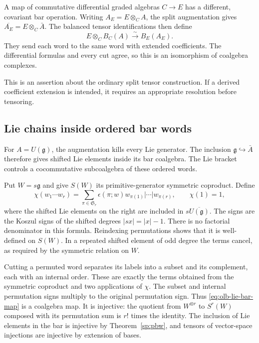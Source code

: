 A map of commutative differential graded algebras $C\to E$
has a different, covariant bar operation.
Writing $A_E=E\otimes_C A$, the split augmentation gives
$\overline{A_E}=E\otimes_C\bar A$.
The balanced tensor identifications then define
\[
 E\otimes_C B_C(A)\xrightarrow{\sim}B_E(A_E).
\]
They send each word to the same word with extended coefficients.
The differential formulas and every cut agree, so this is an
isomorphism of coalgebra complexes.

This is an assertion about the ordinary split tensor construction.
If a derived coefficient extension is intended, it requires an
appropriate resolution before tensoring.

\subsection{Lie chains inside ordered bar words}
\label{sec:olb-lie-chains}

For $A=U(\mathfrak g)$, the augmentation kills every Lie
generator.  The inclusion $\mathfrak g\hookrightarrow\bar A$
therefore gives shifted Lie elements inside its bar coalgebra.
The Lie bracket controls a cocommutative subcoalgebra of these
ordered words.

Put $W=s\mathfrak g$ and give $S(W)$ its primitive-generator
symmetric coproduct.  Define
\begin{equation}
 \chi(w_1\cdots w_r)=
 \sum_{\pi\in\mathfrak S_r}\epsilon(\pi;w)
 w_{\pi(1)}|\cdots|w_{\pi(r)},\qquad \chi(1)=1,
 \label{eq:olb-lie-bar-map}
\end{equation}
where the shifted Lie elements on the right are included in
$s\overline{U(\mathfrak g)}$.
The signs are the Koszul signs of the shifted degrees
$|sx|=|x|-1$.  There is no factorial denominator in this formula.
Reindexing permutations shows that it is well-defined on $S(W)$.
In a repeated shifted element of odd degree the terms cancel, as required
by the symmetric relation on $W$.

Cutting a permuted word separates its labels into a subset and
its complement, each with an internal order.
These are exactly the terms obtained from the symmetric
coproduct and two applications of $\chi$.
The subset and internal permutation signs multiply to the
original permutation sign.  Thus \eqref{eq:olb-lie-bar-map}
is a coalgebra map.
It is injective: the quotient from $W^{\otimes r}$ to $S^r(W)$
composed with its permutation sum is $r!$ times the identity.
The inclusion of Lie elements in the bar is injective by
Theorem~\ref{sp:pbw}, and tensors of vector-space injections
are injective by extension of bases.

